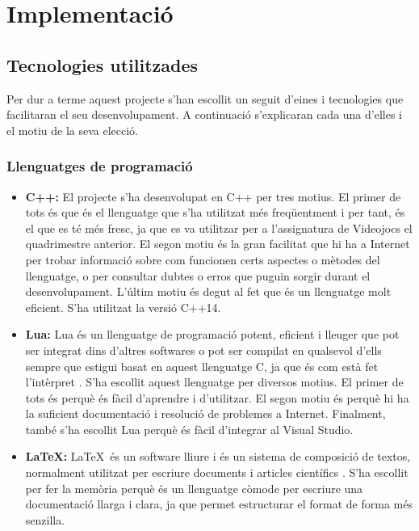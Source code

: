 \documentclass[a4paper]{article}
\begin{document}
\newpage
\section{Implementació}
\subsection{Tecnologies utilitzades}
Per dur a terme aquest projecte s'han escollit un seguit d'eines i tecnologies que facilitaran el seu desenvolupament. A continuació s'explicaran cada una d'elles i el motiu de la seva elecció.

\subsubsection{Llenguatges de programació}
\begin{itemize}
    \item \textbf{C++:} El projecte s'ha desenvolupat en C++ per tres motius. El primer de tots és que és el llenguatge que s'ha utilitzat més freqüentment i per tant, és el que es té més fresc, ja que es va utilitzar per a l'assignatura de Videojocs el quadrimestre anterior. El segon motiu és la gran facilitat que hi ha a Internet per trobar informació sobre com funcionen certs aspectes o mètodes del llenguatge, o per consultar dubtes o erros que puguin sorgir durant el desenvolupament. L'últim motiu és degut al fet que és un llenguatge molt eficient. S'ha utilitzat la versió C++14.
    \item \textbf{Lua:} Lua és un llenguatge de programació potent, eficient i lleuger que pot ser integrat dins d'altres softwares o pot ser compilat en qualsevol d'ells sempre que estigui basat en aquest llenguatge C, ja que és com està fet l'intèrpret \cite{luaAbout}. S'ha escollit aquest llenguatge per diversos motius. El primer de tots és perquè és fàcil d'aprendre i d'utilitzar. El segon motiu és perquè hi ha la suficient documentació i resolució de problemes a Internet. Finalment, també s'ha escollit Lua perquè és fàcil d'integrar al Visual Studio.
    \item \textbf{\LaTeX:} \LaTeX \, és un software lliure i és un sistema de composició de textos, normalment utilitzat per escriure documents i articles científics \cite{wikipediaLatex}. S'ha escollit per fer la memòria perquè és un llenguatge còmode per escriure una documentació llarga i clara, ja que permet estructurar el format de forma més senzilla.
\end{itemize}
\end{document}
